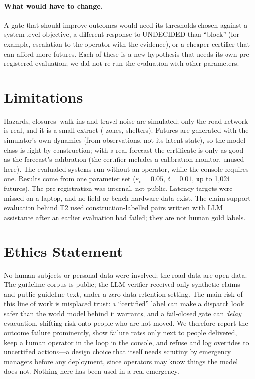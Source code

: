 \documentclass[letterpaper]{article}
\newcommand{\epsd}{\varepsilon_{\mathrm{d}}}
\begin{document}
\paragraph{What would have to change.} A gate that should improve outcomes would need its thresholds
chosen against a system-level objective, a different response to UNDECIDED than ``block'' (for example,
escalation to the operator with the evidence), or a cheaper certifier that can afford more futures. Each
of these is a new hypothesis that needs its own pre-registered evaluation; we did not re-run the
evaluation with other parameters.

\section{Limitations}

Hazards, closures, walk-ins and travel noise are simulated; only the road network is real, and it is a
small extract (\nZones{} zones, \nShelters{} shelters). Futures are generated with the simulator's own
dynamics (from observations, not its latent state), so the model class is right by construction; with a
real forecast the certificate is only as
good as the forecast's calibration (the certifier includes a calibration monitor, unused here). The
evaluated systems run without an operator, while the console requires one. Results come from one
parameter set ($\epsd=0.05$, $\delta=0.01$, up to 1{,}024 futures). The pre-registration was internal, not
public. Latency targets were missed on a laptop, and no field or bench hardware data exist. The
claim-support evaluation behind T2 used construction-labelled pairs written with LLM assistance after an
earlier evaluation had failed; they are not human gold labels.

\section{Ethics Statement}

No human subjects or personal data were involved; the road data are open data. The guideline corpus is
public; the LLM verifier received only synthetic claims and public guideline text, under a
zero-data-retention setting. The main risk of this line of work is misplaced trust: a ``certified''
label can make a dispatch look safer than the world model behind it warrants, and a fail-closed gate can
\emph{delay} evacuation, shifting risk onto people who are not moved. We therefore report the outcome
failure prominently, show failure rates only next to people delivered, keep a human operator in the
loop in the console, and refuse and log overrides to uncertified actions---a design choice that
itself needs scrutiny by emergency managers before any deployment, since operators may know things the
model does not. Nothing here has been used in a real emergency.
\end{document}
